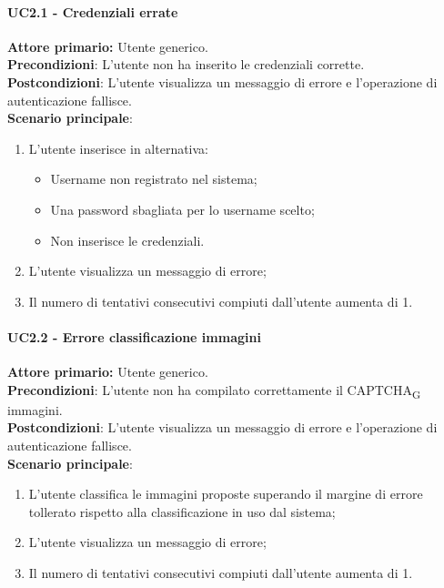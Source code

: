 \paragraph{UC2.1 - Credenziali errate}
\textbf{Attore primario:} Utente generico.\\
\textbf{Precondizioni}: L’utente non ha inserito le credenziali corrette.\\
\textbf{Postcondizioni}: L’utente visualizza un messaggio di errore e l’operazione di autenticazione fallisce.\\

\textbf{Scenario principale}:
\begin{enumerate}
    \item L'utente inserisce in alternativa:
        \begin{itemize}
            \item Username non registrato nel sistema;
            \item Una password sbagliata per lo username scelto;
            \item Non inserisce le credenziali.
        \end{itemize}
	\item L’utente visualizza un messaggio di errore;
	\item Il numero di tentativi consecutivi compiuti dall’utente aumenta di 1.
\end{enumerate}

\paragraph{UC2.2 - Errore classificazione immagini}
\textbf{Attore primario:} Utente generico.\\
    \textbf{Precondizioni}: L’utente non ha compilato correttamente il CAPTCHA\textsubscript{G} immagini.\\
\textbf{Postcondizioni}: L’utente visualizza un messaggio di errore e l’operazione di autenticazione fallisce.\\

\textbf{Scenario principale}:
\begin{enumerate}
    \item L'utente classifica le immagini proposte superando il margine di errore tollerato rispetto alla classificazione in uso dal sistema;
	\item L’utente visualizza un messaggio di errore;
	\item Il numero di tentativi consecutivi compiuti dall’utente aumenta di 1.
\end{enumerate}

